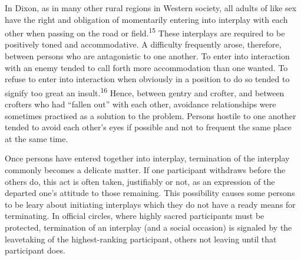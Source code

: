 \documentclass[twoside,symmetric,nobib,justified]{tufte-book}
\begin{document}
\newpage In Dixon, as in many other rural regions in Western society, all adults
of like sex have the right and obligation of momentarily entering into
interplay with each other when passing on the road or field.\textsuperscript{15}
These interplays are required to be positively toned and accommodative.
A difficulty frequently arose, therefore, between persons who are
antagonistic to one another. To enter into interaction with an enemy
tended to call forth more accommodation than one wanted. To refuse to
enter into interaction when obviously in a position to do so tended to
signify too great an insult.\textsuperscript{16} Hence, between gentry and
crofter, and between crofters who had ``fallen out'' with each other,
avoidance relationships were sometimes practised as a solution to the
problem. Persons hostile to one another tended to avoid each other's
eyes if possible and not to frequent the same place at the same time.

Once persons have entered together into interplay, termination of the
interplay commonly becomes a delicate matter. If one participant
withdraws before the others do, this act is often taken, justifiably or
not, as an expression of the departed one's attitude to those remaining.
This possibility causes some persons to be leary about initiating
interplays which they do not have a ready means for terminating. In
official circles, where highly sacred participants must be protected,
termination of an interplay (and a social occasion) is signaled by the
leavetaking of the highest-ranking participant, others not leaving until
that participant does.
\end{document}
